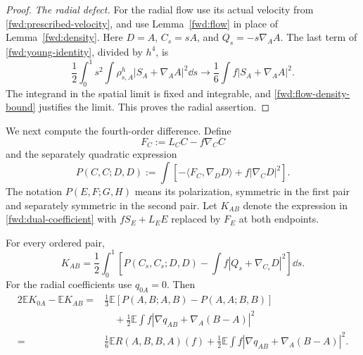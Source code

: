 \begin{proof}
\emph{The radial defect.}
For the radial flow use its actual velocity from
\eqref{fwd:prescribed-velocity}, and use Lemma~\ref{fwd:flow} in
place of Lemma~\ref{fwd:density}. Here \(D=A\), \(C_s=sA\), and
\(Q_s=-s\nabla_AA\). The last term of
\eqref{fwd:young-identity}, divided by \(h^4\), is
\[
 \frac12\int_0^1s^2\int
     \rho^h_{s,A}|S_A+\nabla_AA|^2\dd s
 \longrightarrow\frac16\int f|S_A+\nabla_AA|^2.
\]
The integrand in the spatial limit is fixed and integrable, and
\eqref{fwd:flow-density-bound} justifies the limit. This proves the
radial assertion.
\end{proof}

We next compute the fourth-order difference. Define
\[
 F_C:=L_CC-f\nabla_CC
\]
and the separately quadratic expression
\begin{equation}
\label{fwd:P-definition}
 P(C,C;D,D):=\int\left[
       -\langle F_C,\nabla_DD\rangle+f|\nabla_CD|^2\right].
\end{equation}
The notation \(P(E,F;G,H)\) means its polarization, symmetric in
the first pair and separately symmetric in the second pair. Let
\(K_{AB}\) denote the expression in \eqref{fwd:dual-coefficient}
with \(fS_E+L_EE\) replaced by \(F_E\) at both endpoints.

\begin{lemma}
\label{fwd:algebra}
For every ordered pair,
\begin{equation}
\label{fwd:square-completion}
 K_{AB}=\frac12\int_0^1
 \left[P(C_s,C_s;D,D)-\int f|Q_s+\nabla_{C_s}D|^2\right]\dd s.
\end{equation}
For the radial coefficients use \(q_{0A}=0\). Then
\begin{align}
 2\mathbb E K_{0A}-\mathbb E K_{AB}
 ={}&\frac13\mathbb E
       [P(A,B;A,B)-P(A,A;B,B)]
 \nonumber\\
 &\quad+\frac12\mathbb E\int
 f|\nabla q_{AB}+\nabla_A(B-A)|^2
 \label{fwd:average-P}\\
 ={}&\frac16\mathbb ER(A,B,B,A)(f)
 +\frac12\mathbb E\int
 f|\nabla q_{AB}+\nabla_A(B-A)|^2.
 \label{fwd:average-curvature}
\end{align}
\end{lemma}


